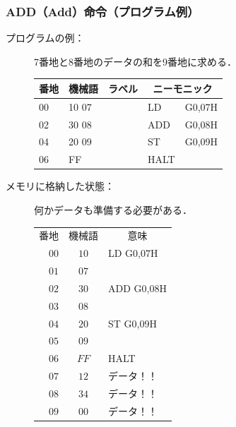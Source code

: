 \documentclass[handout]{beamer}        %
\begin{document}
\begin{frame}
  \frametitle{ADD（Add）命令（プログラム例）}
  \begin{description}
  \item[プログラムの例：]7番地と8番地のデータの和を9番地に求める．\\
    {\ttfamily\small\begin{center}
      \begin{tabular}{|l|l|l|l l|} \hline
        番地 & 機械語 & ラベル & \multicolumn{2}{|c|}{ニーモニック} \\
        \hline
        00 & 10 07 & & LD   & G0,07H \\
        02 & 30 08 & & ADD  & G0,08H \\
        04 & 20 09 & & ST   & G0,09H \\
        06 & FF    & & HALT & \\
        \hline
      \end{tabular}
    \end{center}}
    \vfill

    \item[メモリに格納した状態：] 何かデータも準備する必要がある．
      {\ttfamily\small\begin{center}
        \begin{tabular}{r|c|l}
          \multicolumn{1}{c}{番地} &
          \multicolumn{1}{c}{機械語} &
          \multicolumn{1}{c}{意味} \\
          \cline{2-2}
          $00$ & $10$ & LD G0,07H \\
          \cline{2-2}
          $01$ & $07$ &           \\
          \cline{2-2}
          $02$ & $30$ & ADD G0,08H \\
          \cline{2-2}
          $03$ & $08$ &           \\
          \cline{2-2}
          $04$ & $20$ & ST G0,09H \\
          \cline{2-2}
          $05$ & $09$ &           \\
          \cline{2-2}
          $06$ & $FF$ & HALT      \\
          \cline{2-2}
          $07$ & $12$ & データ！！\\
          \cline{2-2}
          $08$ & $34$ & データ！！\\
          \cline{2-2}
          $09$ & $00$ & データ！！\\
          \cline{2-2}
        \end{tabular}
      \end{center}}
      \vfill

  \end{description}
\end{frame}
\end{document}
